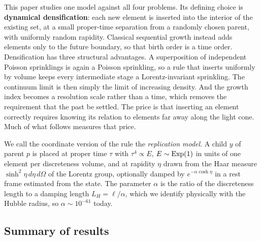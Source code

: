 This paper studies one model against all four problems. Its
defining choice is \textbf{dynamical densification}: each
new element is inserted into the interior of the existing
set, at a small proper-time separation from a randomly
chosen parent, with uniformly random rapidity. Classical
sequential growth instead adds elements only to the future
boundary, so that birth order is a time order. Densification
has three structural advantages. A superposition of
independent Poisson sprinklings is again a Poisson
sprinkling, so a rule that inserts uniformly by volume keeps
every intermediate stage a Lorentz-invariant sprinkling. The
continuum limit is then simply the limit of increasing
density. And the growth index becomes a resolution scale
rather than a time, which removes the requirement that the
past be settled. The price is that inserting an element
correctly requires knowing its relation to elements far away
along the light cone. Much of what follows measures that
price.

We call the coordinate version of the rule the
\emph{replication model}. A child \(y\) of parent \(p\) is
placed at proper time \(\tau\) with \(\tau^4\propto E\),
\(E\sim{\rm Exp}(1)\) in units of one element per
discreteness volume, and at rapidity \(\eta\) drawn from the
Haar measure \(\sinh^2\eta\,d\eta\,d\Omega\) of the Lorentz
group, optionally damped by \(e^{-\alpha\cosh\eta}\) in a
rest frame estimated from the state. The parameter
\(\alpha\) is the ratio of the discreteness length to a
damping length \(L_H=\ell/\alpha\), which we identify
physically with the Hubble radius, so \(\alpha\sim10^{-61}\)
today.

\hypertarget{summary-of-results}{%
\subsection{Summary of results}\label{summary-of-results}}

